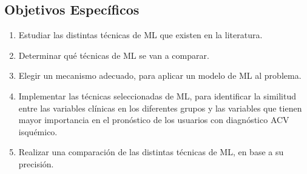 \subsection{Objetivos Específicos}
\begin{enumerate}
	\renewcommand{\theenumi}{\Roman{enumi}} %
	\item Estudiar las distintas técnicas de ML que existen en la literatura. 
	\item Determinar qué técnicas de ML se van a comparar.
	\item Elegir un mecanismo adecuado, para aplicar un modelo de ML  al problema.
	\item Implementar las técnicas seleccionadas de ML, para identificar la similitud entre las variables clínicas en los diferentes grupos y  las variables que tienen mayor importancia en el pronóstico de los usuarios con diagnóstico ACV isquémico.
	\item Realizar una comparación de las distintas técnicas de ML, en base a su precisión.
\end{enumerate}